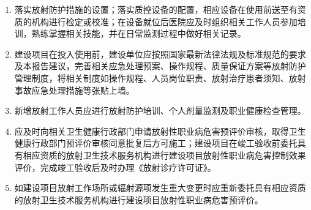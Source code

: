 \begin{enumerate}
\item 落实放射防护措施的设置；落实质控设备的配置，相应设备在使用前送至有资质的机构进行检定或校准；在设备就位后医院应及时组织相关工作人员参加培训，熟练掌握相关技能，并在日常监测过程中做好相关记录。
\item 建设项目在投入使用前，建设单位应按照国家最新法律法规及标准规范的要求及本报告建议，完善相关应急处理预案、操作规程、质量保证方案等放射防护管理制度，将相关制度如操作规程、人员岗位职责、放射治疗患者须知、放射事故应急处理措施等张贴上墙。
\item 新增放射工作人员应进行放射防护培训、个人剂量监测及职业健康检查管理。
\item 应及时向相关卫生健康行政部门申请放射性职业病危害预评价审核，取得卫生健康行政部门预评价审核同意批复后方可施工；建设项目在竣工验收前委托具有相应资质的放射卫生技术服务机构进行建设项目放射性职业病危害控制效果评价，完成竣工验收后及时办理《放射诊疗许可证》。
\item 如建设项目放射工作场所或辐射源项发生重大变更时应重新委托具有相应资质的放射卫生技术服务机构进行建设项目放射性职业病危害预评价。
\end{enumerate}
